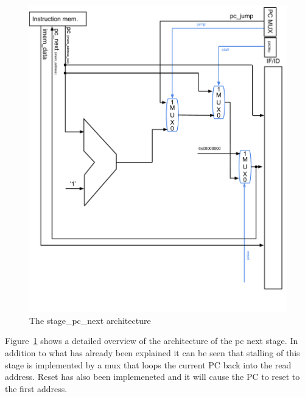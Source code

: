 \begin{figure}[h]
        \centering\includegraphics[scale=0.5]{figures/stage_pc_next}
        \caption{The stage\_pc\_next architecture}
        \label{fig:stage_pc_next}
\end{figure}

Figure~\ref{fig:stage_pc_next} shows a detailed overview of the architecture of the 
pc next stage. In addition to what has already been explained it can be seen that 
stalling of this stage is implemented by a mux that loops the current PC back into
the read address. Reset has also been implemeneted and it will cause the PC to reset
to the first address.